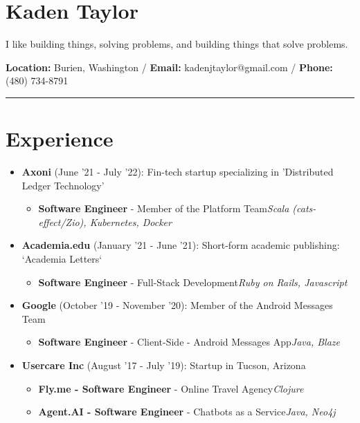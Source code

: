 \documentclass{article}
\begin{document}
\section*{Kaden Taylor}
I like building things, solving problems, and building things that solve problems.
\newline

\textbf{Location:} Burien, Washington /  \textbf{Email:} kadenjtaylor@gmail.com / \textbf{Phone:} (480) 734-8791

\noindent\rule{\linewidth}{1pt}

\section*{Experience}

\begin{itemize}\item \textbf{Axoni} {(June '21 - July '22)}: Fin-tech startup specializing in 'Distributed Ledger Technology' \begin{itemize}\item \textbf{Software Engineer} - Member of the Platform Team\newline \textit{Scala (cats-effect/Zio), Kubernetes, Docker}\end{itemize}
\item \textbf{Academia.edu} {(January '21 - June '21)}: Short-form academic publishing: `Academia Letters` \begin{itemize}\item \textbf{Software Engineer} - Full-Stack Development\newline \textit{Ruby on Rails, Javascript}\end{itemize}
\item \textbf{Google} {(October '19 - November '20)}: Member of the Android Messages Team \begin{itemize}\item \textbf{Software Engineer} - Client-Side - Android Messages App\newline \textit{Java, Blaze}\end{itemize}
\item \textbf{Usercare Inc} {(August '17 - July '19)}: Startup in Tucson, Arizona \begin{itemize}\item \textbf{Fly.me - Software Engineer} - Online Travel Agency\newline \textit{Clojure}
\item \textbf{Agent.AI - Software Engineer} - Chatbots as a Service\newline \textit{Java, Neo4j}\end{itemize}

\end{itemize}
\end{document}
